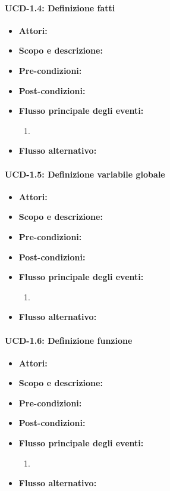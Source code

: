 \paragraph{UCD-1.4: Definizione fatti} %

\begin{itemize}
	\item \textbf{Attori:} 
	\item \textbf{Scopo e descrizione:} 
	\item \textbf{Pre-condizioni:} 
	\item \textbf{Post-condizioni:} 
	\item \textbf{Flusso principale degli eventi:}
		\begin{enumerate}
			\item 
		\end{enumerate}
	\item \textbf{Flusso alternativo:} 
\end{itemize}


\paragraph{UCD-1.5: Definizione variabile globale} %

\begin{itemize}
	\item \textbf{Attori:} 
	\item \textbf{Scopo e descrizione:} 
	\item \textbf{Pre-condizioni:} 
	\item \textbf{Post-condizioni:} 
	\item \textbf{Flusso principale degli eventi:}
		\begin{enumerate}
			\item 
		\end{enumerate}
	\item \textbf{Flusso alternativo:} 
\end{itemize}

\paragraph{UCD-1.6: Definizione funzione} %

\begin{itemize}
	\item \textbf{Attori:} 
	\item \textbf{Scopo e descrizione:} 
	\item \textbf{Pre-condizioni:} 
	\item \textbf{Post-condizioni:} 
	\item \textbf{Flusso principale degli eventi:}
		\begin{enumerate}
			\item 
		\end{enumerate}
	\item \textbf{Flusso alternativo:} 
\end{itemize}
